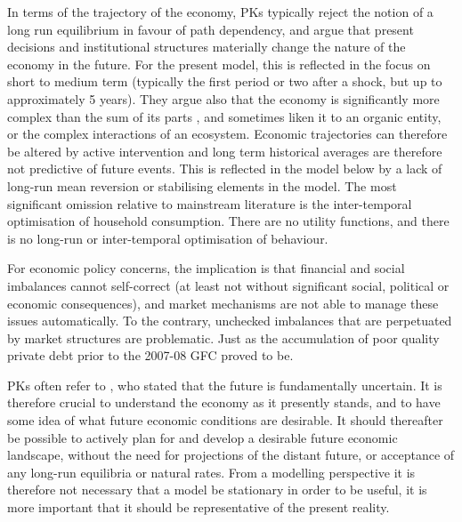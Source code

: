 \documentclass[
]{book}
\begin{document}
In terms of the trajectory of the economy, PKs typically reject the notion of a long run equilibrium in favour of path dependency, and argue that present decisions and institutional structures materially change the nature of the economy in the future. For the present model, this is reflected in the focus on short to medium term (typically the first period or two after a shock, but up to approximately 5 years). They argue also that the economy is significantly more complex than the sum of its parts \citep{chick2003}, and sometimes liken it to an organic entity, or the complex interactions of an ecosystem. Economic trajectories can therefore be altered by active intervention and long term historical averages are therefore not predictive of future events. This is reflected in the model below by a lack of long-run mean reversion or stabilising elements in the model. The most significant omission relative to mainstream literature is the inter-temporal optimisation of household consumption. There are no utility functions, and there is no long-run or inter-temporal optimisation of behaviour.

For economic policy concerns, the implication is that financial and social imbalances cannot self-correct (at least not without significant social, political or economic consequences), and market mechanisms are not able to manage these issues automatically. To the contrary, unchecked imbalances that are perpetuated by market structures are problematic. Just as the accumulation of poor quality private debt prior to the 2007-08 GFC proved to be.

PKs often refer to \citet{keynes1937}, who stated that the future is fundamentally uncertain. It is therefore crucial to understand the economy as it presently stands, and to have some idea of what future economic conditions are desirable. It should thereafter be possible to actively plan for and develop a desirable future economic landscape, without the need for projections of the distant future, or acceptance of any long-run equilibria or natural rates. From a modelling perspective it is therefore not necessary that a model be stationary in order to be useful, it is more important that it should be representative of the present reality.
\end{document}
